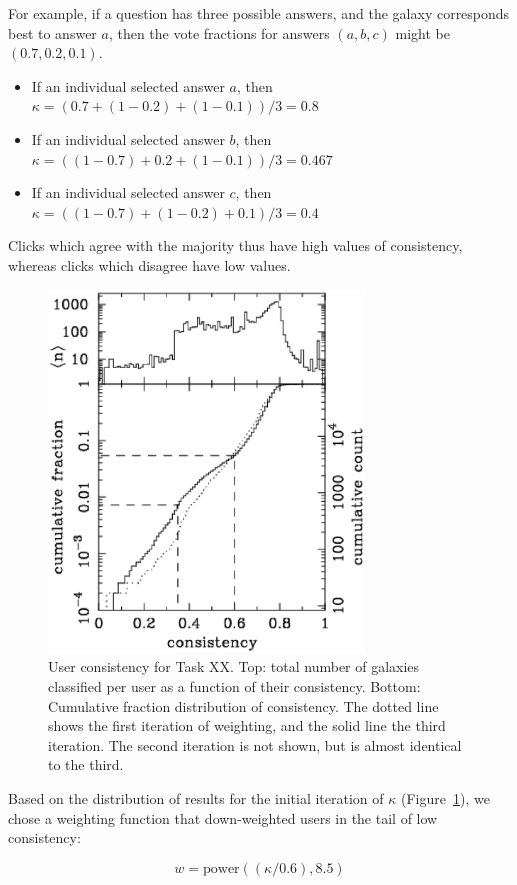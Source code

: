 \documentclass[useAMS,usenatbib]{mn2e}
\begin{document}
For example, if a question has three possible answers, and the galaxy corresponds best to answer $a$, then the vote fractions for answers $(a, b, c)$ might be $(0.7, 0.2, 0.1)$.
\begin{itemize}
\item If an individual selected answer $a$, then $\kappa = (0.7 + (1-0.2) + (1-0.1))/3 = 0.8$
\item If an individual selected answer $b$, then $\kappa = ((1-0.7) + 0.2 + (1-0.1))/3 = 0.467$
\item If an individual selected answer $c$, then $\kappa = ((1-0.7) + (1-0.2) + 0.1)/3 = 0.4$
\end{itemize}
\noindent Clicks which agree with the majority thus have high values of consistency, whereas clicks which disagree have low values.

\begin{figure}
\includegraphics[angle=0,width=3.3in]{figures/user_consistency.eps}
\caption{User consistency for Task XX. Top: total number of galaxies classified per user as a function of their consistency. Bottom: Cumulative fraction distribution of consistency. The dotted line shows the first iteration of weighting, and the solid line the third iteration. The second iteration is not shown, but is almost identical to the third. 
\label{fig-consistency}}
\end{figure}

Based on the distribution of results for the initial iteration of $\kappa$ (Figure~\ref{fig-consistency}), we chose a weighting function that down-weighted users in the tail of low consistency:

\begin{equation}
w = \text{power}((\kappa/0.6),8.5)
\label{eqn-weight}
\end{equation}
\end{document}
